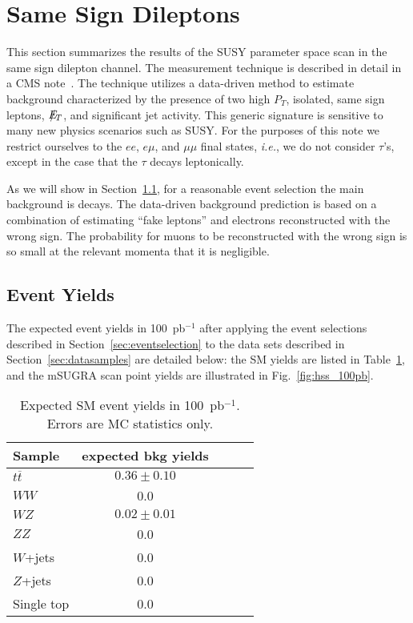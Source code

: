 \section{Same Sign Dileptons}
\label{sec:samesign}

This section summarizes the results of the SUSY parameter space scan
in the same sign dilepton channel. The measurement technique is
described in detail in a CMS note~\cite{ssnote}. The technique
utilizes a data-driven method to estimate background characterized
by the presence of two high $P_T$, isolated, same sign leptons,
$E\!\!\!\!/_T$, and significant jet activity. This generic signature is
sensitive to many new physics scenarios such as SUSY.  For the purposes
of this note we restrict ourselves to the $ee$, $e\mu$, and $\mu\mu$
final states, {\em i.e.}, we do not consider $\tau$'s, except in the
case that the $\tau$ decays leptonically. 

As we will show in Section~\ref{sec:ssyields}, for a reasonable event
selection the main background is \ttbar decays. The data-driven
background prediction is based on a 
combination of estimating ``fake leptons''\cite{fakenote} and 
electrons reconstructed with the wrong sign\cite{ssnote}. The probability
for muons to be reconstructed with the wrong sign is so small at the relevant momenta
that it is negligible.

\subsection{Event Yields}
\label{sec:ssyields}

The expected event yields in 100~pb$^{-1}$ after applying the event selections
described in Section~\ref{sec:eventselection} to the data sets described in
Section~\ref{sec:datasamples} are detailed below: the SM yields are listed in
Table~\ref{tab:ssyields}, and the mSUGRA scan point yields are illustrated in
Fig.~\ref{fig:hss_100pb}.

\begin{table}[hbt]
\begin{center}
\begin{tabular}{|l|c|c|c|c|}\hline
Sample           & expected bkg yields   \\ \hline
$t\overline{t}$  &   $0.36\pm 0.10 $         \\ 
$WW$             &   0.0          \\ 
$WZ$             &   $0.02\pm 0.01$          \\ 
$ZZ$             &   0.0          \\ 
$W$+jets         &   0.0             \\
$Z$+jets         &   0.0             \\ 
Single top       &   0.0          \\ \hline
\end{tabular}
\caption{Expected SM event yields in 100~pb$^{-1}$. Errors are MC statistics only.\label{tab:ssyields}}
\end{center}
\end{table}


